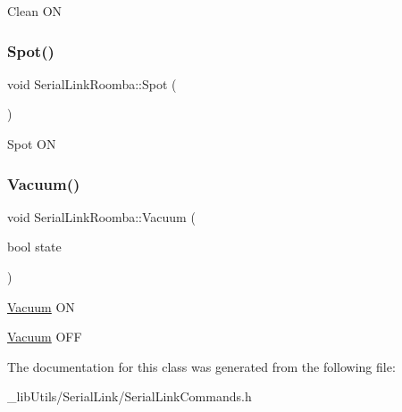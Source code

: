 Clean ON \mbox{\label{class_serial_link_roomba_a8f5da920bc06886a0d02b5e1fe519fd6}} 
\subsubsection{\texorpdfstring{Spot()}{Spot()}}
{\footnotesize\ttfamily void Serial\+Link\+Roomba\+::\+Spot (\begin{DoxyParamCaption}{ }\end{DoxyParamCaption})\hspace{0.3cm}{\ttfamily [inline]}}

Spot ON \mbox{\label{class_serial_link_roomba_ab9d56883a0b905cc4ed67adb5bf74ff3}} 
\subsubsection{\texorpdfstring{Vacuum()}{Vacuum()}}
{\footnotesize\ttfamily void Serial\+Link\+Roomba\+::\+Vacuum (\begin{DoxyParamCaption}\item[{bool}]{state }\end{DoxyParamCaption})\hspace{0.3cm}{\ttfamily [inline]}}

\mbox{\hyperlink{class_vacuum}{Vacuum}} ON

\mbox{\hyperlink{class_vacuum}{Vacuum}} O\+FF 

The documentation for this class was generated from the following file\+:\begin{DoxyCompactItemize}
\item 
\+\_\+lib\+Utils/\+Serial\+Link/Serial\+Link\+Commands.\+h\end{DoxyCompactItemize}
